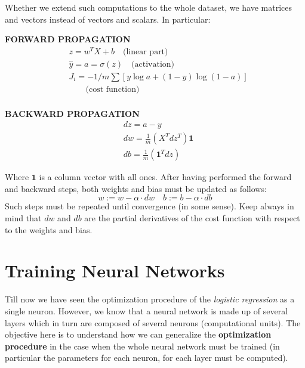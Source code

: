 \noindent
Whether we extend such computations to the whole dataset, we have matrices and vectors instead of vectors and scalars. In particular:
\begin{multicols}{2}
    \noindent
    \textbf{FORWARD PROPAGATION}
    \begin{align*}
        &z=w^T{X}+b \quad \text{(linear part)}\\
        &\hat{y}=a=\sigma(z)   \quad \text{(activation)}\\
        &J_{i}=-1/m \sum [y\log{a}+(1-y)\log(1-a)] \\
        & \quad \quad \text{(cost function)}
    \end{align*}
    \newcolumn\\
    \noindent
    \textbf{BACKWARD PROPAGATION}
    \begin{align*}
        &dz = a-y\\
        &dw= \frac{1}{m} (X^T{dz^T})\mathbf{1}\\
        &db=\frac{1}{m}(\mathbf{1}^T{dz})
    \end{align*}
\end{multicols}
\noindent
Where $\mathbf{1}$ is a column vector with all ones. After having performed the forward and backward steps, both weights and bias must be updated as follows: 
\begin{equation}
    w:=w-\alpha\cdot{dw} \quad b:= b-\alpha\cdot{db}
\end{equation}
Such steps must be repeated until convergence (in some sense). Keep always in mind that $dw$ and $db$ are the partial derivatives of the cost function with respect to the weights and bias.

\section{Training Neural Networks}
Till now we have seen the optimization procedure of the \textit{logistic regression} as a single neuron. However, we know that a neural network is made up of several layers which in turn are composed of several neurons (computational units). The objective here is to understand how we can generalize the \textbf{optimization procedure} in the case when the whole neural network must be trained (in particular the parameters for each neuron, for each layer must be computed).

